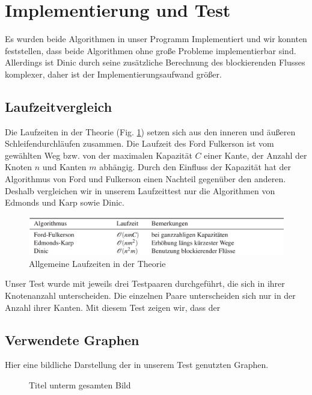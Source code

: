 \documentclass[a4paper]{llncs}
\begin{document}
\section{Implementierung und Test}
\label{Experimente}
Es wurden beide Algorithmen in unser Programm Implementiert und wir konnten feststellen, dass beide Algorithmen ohne große Probleme implementierbar sind. Allerdings ist Dinic durch seine zusätzliche Berechnung des blockierenden Flusses komplexer, daher ist der Implementierungsaufwand größer.
\subsection{Laufzeitvergleich}
Die Laufzeiten in der Theorie (Fig. \ref{fig:lzvergleich}) setzen sich aus den inneren und äußeren Schleifendurchläufen zusammen.
Die Laufzeit des Ford Fulkerson ist vom gewählten Weg bzw. von der maximalen Kapazität $C$ einer Kante, der Anzahl der Knoten $n$ und Kanten $m$  abhängig.
Durch den Einfluss der Kapazität hat der Algorithmus von Ford und Fulkerson einen Nachteil gegenüber den anderen.
Deshalb vergleichen wir in unserem Laufzeittest nur die Algorithmen von Edmonds und Karp sowie Dinic.
\begin{figure}[H] 
  \centering
     \includegraphics[scale=0.42]{lzvergleich} 
  \caption{Allgemeine Laufzeiten in der Theorie \citep{GKuA}}
  \label{fig:lzvergleich}
\end{figure}
Unser Test wurde mit jeweils drei Testpaaren durchgeführt, die sich in ihrer Knotenanzahl unterscheiden.
Die einzelnen Paare unterscheiden sich nur in der Anzahl ihrer Kanten.
Mit diesem Test zeigen wir, dass der 

\subsection{Verwendete Graphen}
Hier eine bildliche Darstellung der in unserem Test genutzten Graphen.


\begin{figure}
\label{fig:testgraph1}
\caption{Titel unterm gesamten Bild} 
\end{figure}
\end{document}
